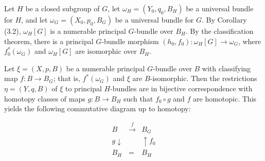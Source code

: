 Let $H$ be a closed subgroup of $G$, let $\omega_H = (Y_0, q_0, B_H)$ be a universal bundle for $H$, and let $\omega_G = (X_0, p_0, B_G)$ be a universal bundle for $G$. By Corollary (3.2), $\omega_H[G]$ is a numerable principal $G$-bundle over $B_H$. By the classification theorem, there is a principal $G$-bundle morphism $(h_0, f_0): \omega_H[G] \rightarrow \omega_G$, where $f_0^*(\omega_G)$ and $\omega_H[G]$ are isomorphic over $B_H$.

Let $\xi = (X, p, B)$ be a numerable principal $G$-bundle over $B$ with classifying map $f: B \rightarrow B_G$; that is, $f^*(\omega_G)$ and $\xi$ are $B$-isomorphic. Then the restrictions $\eta = (Y, q, B)$ of $\xi$ to principal $H$-bundles are in bijective correspondence with homotopy classes of maps $g: B \rightarrow B_H$ such that $f_0 \circ g$ and $f$ are homotopic. This yields the following commutative diagram up to homotopy:

$$
\begin{array}{ccc}
B & \xrightarrow{f} & B_G \\[4pt]
{\scriptstyle g}\downarrow & & \uparrow {\scriptstyle f_0} \\[4pt]
B_H & = & B_H
\end{array}
$$
